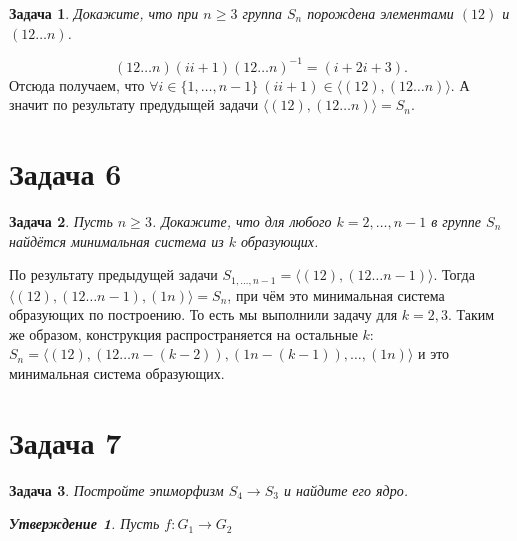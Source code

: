 \documentclass{article}
\newtheorem{task}{Задача}
\newtheorem{statement}{Утверждение}
\newcommand{\gen}[1]{\langle #1 \rangle}
\newcommand{\srange}[2]{\{#1, \dots, #2\}}
\newcommand{\range}[2]{#1, \dots, #2}
\newcommand{\ad}[2]{#1#2#1^{-1}}
\begin{document}
\begin{task}
Докажите, что при $n \geq 3$ группа $S_n$ порождена элементами $(12)$ и $(12 \dots n)$.
\end{task}

\begin{equation*}
    \ad{(12 \dots n)}{(ii+1)} = (i+2 i+3).
\end{equation*}
Отсюда получаем, что $\forall i \in \srange{1}{n - 1} ~ (i i+1) \in \gen{(12), (12 \dots n)}$.
А значит по результату предудыщей задачи $\gen{(12), (12 \dots n)} = S_n$.

\section*{Задача 6}

\begin{task}
Пусть $n \geq 3$. Докажите, что для любого $k = \range{2}{n - 1}$ в группе $S_n$ 
найдётся минимальная система из $k$ образующих.  
\end{task}

По результату предыдущей задачи $S_{\range{1}{n - 1}} = \gen{(12), (12 \dots n - 1)}$.
Тогда $\gen{(12), (12 \dots n - 1), (1n)} = S_n$, 
при чём это минимальная система образующих по построению. То есть мы выполнили задачу для $k = 2, 3$.
Таким же образом, конструкция распространяется на остальные $k$:
$S_n = \gen{(12), (12 \dots n - (k - 2)), (1 n - (k - 1)), \dots, (1 n)}$ 
и это минимальная система образующих.

\section*{Задача 7}
\begin{task}
Постройте эпиморфизм $S_4 \to S_3$ и найдите его ядро.

\begin{statement}
Пусть $f: G_1 \to G_2$
\end{statement}
\end{task}
\end{document}

